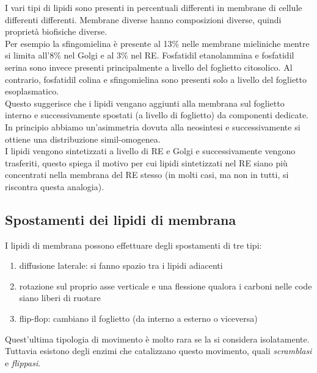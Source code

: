     I vari tipi di lipidi sono presenti in percentuali differenti in membrane di cellule differenti differenti. 
    Membrane diverse hanno composizioni diverse, quindi proprietà biofisiche diverse. \\
    Per esempio la sfingomielina è presente al 13\% nelle membrane mieliniche mentre si limita all'8\% nel Golgi e al 3\% nel RE. 
    Fosfatidil etanolammina e fosfatidil serina sono invece presenti principalmente a livello del foglietto citosolico. 
    Al contrario, fosfatidil colina e sfingomielina sono presenti solo a livello del foglietto esoplasmatico.\\
    Questo suggerisce che i lipidi vengano aggiunti alla membrana sul foglietto interno e successivamente spostati (a livello di foglietto) da componenti dedicate. In principio abbiamo un'asimmetria dovuta alla neosintesi e successivamente si ottiene una distribuzione simil-omogenea.\\
    I lipidi vengono sintetizzati a livello di RE e Golgi e successivamente vengono trasferiti, questo spiega il motivo per cui lipidi sintetizzati nel RE siano più concentrati nella membrana del RE stesso (in molti casi, ma non in tutti, si riscontra questa analogia).
    \subsection{Spostamenti dei lipidi di membrana}
        I lipidi di membrana possono effettuare degli spostamenti di tre tipi:
        \begin{enumerate}
            \item diffusione laterale: si fanno spazio tra i lipidi adiacenti
            \item rotazione sul proprio asse verticale e una flessione qualora i carboni nelle code siano liberi di ruotare
            \item flip-flop: cambiano il foglietto (da interno a esterno o viceversa)
        \end{enumerate}
        Quest'ultima tipologia di movimento è molto rara se la si considera isolatamente. Tuttavia esistono degli enzimi che catalizzano questo movimento, quali \textit{scramblasi} e \textit{flippasi}.\\
